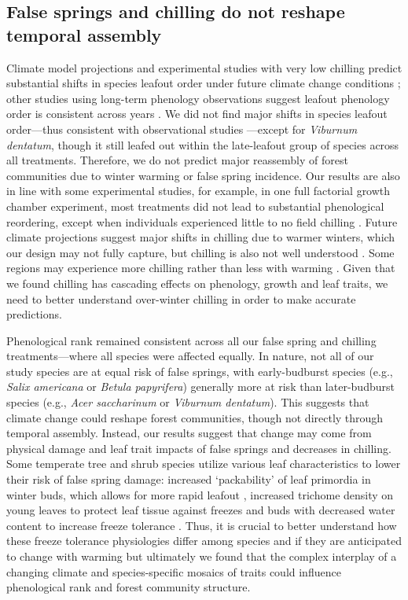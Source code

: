 \documentclass{article}\usepackage[]{graphicx}\usepackage[]{color}
\begin{document}
\subsection*{False springs and chilling do not reshape temporal assembly}
Climate model projections and experimental studies with very low chilling predict substantial shifts in species leafout order under future climate change conditions \citep{Roberts2015, Laube2014}; other studies using long-term phenology observations suggest leafout phenology order is consistent across years \citep{Wesolowski2006}. We did not find major shifts in species leafout order---thus consistent with observational studies \citep{Wesolowski2006}---except for \textit{Viburnum dentatum}, though it still leafed out within the late-leafout group of species across all treatments. Therefore, we do not predict major reassembly of forest communities due to winter warming or false spring incidence. Our results are also in line with some experimental studies, for example, in one full factorial growth chamber experiment, most treatments did not lead to substantial phenological reordering, except when individuals experienced little to no field chilling \citep{Laube2014}. Future climate projections suggest major shifts in chilling due to warmer winters, which our design may not fully capture, but chilling is also not well understood \citep{Nanninga2017}. Some regions may experience more chilling rather than less with warming \citep{Fraga2019}. Given that we found chilling has cascading effects on phenology, growth and leaf traits, we need to better understand over-winter chilling in order to make accurate predictions. 
    
Phenological rank remained consistent across all our false spring and chilling treatments---where all species were affected equally. In nature, not all of our study species are at equal risk of false springs, with early-budburst species (e.g., \textit{Salix americana} or \textit{Betula papyrifera}) generally more at risk than later-budburst species (e.g., \textit{Acer saccharinum} or \textit{Viburnum dentatum}). This suggests that climate change could reshape forest communities, though not directly through temporal assembly. Instead, our results suggest that change may come from physical damage and leaf trait impacts of false springs and decreases in chilling. Some temperate tree and shrub species utilize various leaf characteristics to lower their risk of false spring damage: increased `packability' of leaf primordia in winter buds, which allows for more rapid leafout \citep{Edwards2017}, increased trichome density on young leaves to protect leaf tissue against freezes \citep{Agrawal2004, Prozherina2003} and buds with decreased water content to increase freeze tolerance \citep{Beck2007, Hofmann2015, Kathke2011, Morin2007,  Muffler2016, Nielsen2009, Poirier2010}. Thus, it is crucial to better understand how these freeze tolerance physiologies differ among species and if they are anticipated to change with warming but ultimately we found that the complex interplay of a changing climate and species-specific mosaics of traits could influence phenological rank and forest community structure. 
\end{document}
